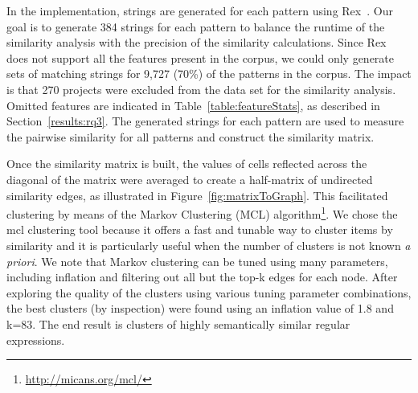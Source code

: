 In the implementation, strings are generated for each pattern using Rex~\cite{rex}.
Our goal is to generate 384 strings for each pattern to balance the runtime of the similarity analysis with the precision of the similarity calculations.
 Since Rex does not support all the features present in the corpus, we could only generate sets of matching strings for 9,727 (70\%) of the  patterns in the corpus. The impact is that 270 projects were excluded from the data set for the similarity analysis. Omitted features are indicated in Table~\ref{table:featureStats}, as described in Section~\ref{results:rq3}.
The generated strings for each pattern are used to measure the pairwise similarity for all patterns and construct the similarity matrix.

Once the similarity matrix is built, the values of cells reflected across the diagonal of the matrix were averaged to create a half-matrix of undirected similarity edges, as illustrated in Figure~\ref{fig:matrixToGraph}. This facilitated clustering by means of the  Markov Clustering (MCL) algorithm\footnote{\url{http://micans.org/mcl/}}.
We chose the mcl clustering tool because it offers a fast and tunable way to cluster items by similarity and it is particularly useful when the number of clusters is not known \emph{a priori}.
We note that Markov clustering can be tuned using many parameters, including inflation and filtering out all but the top-k edges for each node.  After exploring the quality of the clusters using various tuning parameter combinations, the best clusters (by inspection) were found using an inflation value of 1.8 and k=83.
The end result is clusters of highly semantically similar regular expressions.




